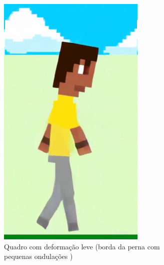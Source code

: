 \begin{figure}[htbp]
    \begin{subfigure}{0.32\linewidth}
        \centering
        \includegraphics[width=1\linewidth]{figs/vidu/3leve.png}
        \caption{\small Quadro com deformação leve (borda da perna com pequenas ondulações )}
        \label{fig:viduDeformacao3Leve}
    \end{subfigure}
    \begin{subfigure}{0.32\linewidth}
        \centering

\end{subfigure}
\end{figure}
